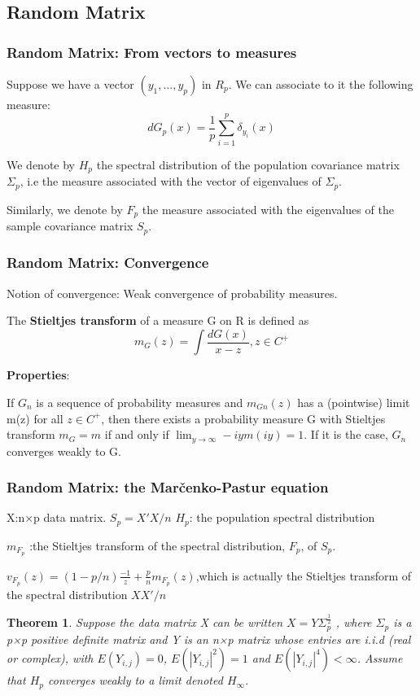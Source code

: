 \documentclass[aspectratio=169, 10pt, utf8, mathserif]{beamer}
\newtheorem{thm}{Theorem}
\begin{document}
\subsection{Random Matrix}
\begin{frame}
	\frametitle{Random Matrix: From vectors to measures}
	
Suppose we have a vector $(y_1,\dots,y_p)$ in $R_p$. We can associate to it the following measure:\[dG_p(x)=\frac{1}{p}\sum_{i=1}^{p}\delta_{y_i}(x)\]

 We denote by $H_p$ the spectral distribution of the population covariance matrix $\Sigma_p$, i.e the measure associated with the vector of eigenvalues of $\Sigma_p$.
 
 Similarly, we denote by $F_p$ the measure associated with the eigenvalues of the sample covariance matrix $S_p$. 
\end{frame}
\begin{frame}
	\frametitle{Random Matrix: Convergence}
	Notion of convergence:  Weak convergence of probability measures.
	
	The \textbf{Stieltjes transform }of a measure G on R is deﬁned as\[m_G(z)=\int\frac{dG(x)}{x-z}, z\in C^+\]
	
\textbf{Properties}: 	

If $G_n$ is a sequence of probability measures and $m_{Gn}(z)$ has a (pointwise) limit m(z) for all $z\in C^+$, then there exists a probability measure G with Stieltjes transform $m_G = m$ if and only if $\lim_{y\rightarrow\infty}-iym(iy) = 1$. If it is the case, $G_n$ converges weakly to G. 
\end{frame}
\begin{frame}
	\frametitle{Random Matrix: the Mar\v{c}enko-Pastur equation}
	  X:n×p data matrix.  $S_p = X'X/n$   $H_p$: the population spectral distribution
	  
	 ${m_{F_p}}$ :the Stieltjes transform of the spectral distribution, $F_p$, of $S_p$. 
	   
	 ${v_{F_p}(z)=(1-p/n)\frac{-1}{z}+\frac{p}{n}m_{F_p}(z)}$,which is actually the Stieltjes transform of the spectral distribution $XX'/n$
	 
	\begin{thm}

	 
	  Suppose the data matrix X can be written $X=Y\Sigma_p^{\frac{1}{2}}$ , where  $\Sigma_p$ is a p×p positive deﬁnite matrix and Y is an n×p matrix whose entries are i.i.d (real or complex), with $E(Y_{i,j}) = 0$, $E(|Y_{i,j}|^2) = 1$ and $E(|Y_{i,j}|^4)<\infty$. Assume that $H_p$ converges weakly to a limit denoted $H_\infty$.
	  	\end{thm}
\end{frame}
\end{document}

